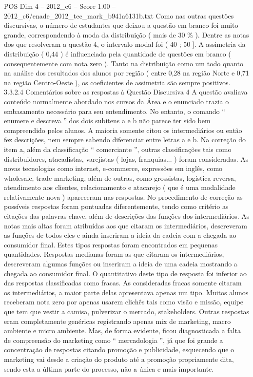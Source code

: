 \begin{textsample}{POS Dim 4 – 2012\_c6 – Score 1.00 – 2012\_c6/enade\_2012\_tec\_mark\_b941a6131b.txt}
Como nas outras questões discursivas, o número de estudantes que deixou a questão em branco foi muito grande, correspondendo à moda da distribuição ( mais de 30 \% ).
Dentre as notas dos que resolveram a questão 4, o intervalo modal foi ( 40 ; 50 ].
A assimetria da distribuição ( 0,44 ) é influenciada pela quantidade de questões em branco ( consequentemente com nota zero ).
Tanto na distribuição como um todo quanto na análise dos resultados dos alunos por região ( entre 0,28 na região Norte e 0,71 na região Centro-Oeste ), os coeficientes de assimetria são sempre positivos. 3.3.2.4 Comentários sobre as respostas à Questão Discursiva 4 A questão avaliava conteúdo normalmente abordado nos cursos da Área e o enunciado trazia o embasamento necessário para seu entendimento.
No entanto, o comando “ enumere e descreva ” dos dois subitens a e b não parece ter sido bem compreendido pelos alunos.
A maioria somente citou os intermediários ou então fez descrições, nem sempre sabendo diferenciar entre letras a e b.
Na correção do item a, além da classificação “ comerciante ”, outras classificações tais como distribuidores, atacadistas, varejistas ( lojas, franquias... ) foram consideradas.
As novas tecnologias como internet, e-commerce, expressões em inglês, como wholesale, trade marketing, além de outras, como grossistas, logística reversa, atendimento aos clientes, relacionamento e atacarejo ( que é uma modalidade relativamente nova ) apareceram nas respostas.
No procedimento de correção as possíveis respostas foram pontuadas diferentemente, tendo como critério as citações das palavras-chave, além de descrições das funções dos intermediários.
As notas mais altas foram atribuídas aos que citaram os intermediários, descreveram as funções de todos eles e ainda inseriram a ideia da cadeia com a chegada ao consumidor final.
Estes tipos respostas foram encontrados em pequenas quantidades.
Respostas medianas foram as que citaram os intermediários, descreveram algumas funções ou inseriram a ideia de uma cadeia mostrando a chegada ao consumidor final.
O quantitativo deste tipo de resposta foi inferior ao das respostas classificadas como fracas.
As consideradas fracas somente citaram os intermediários, a maior parte delas apresentava apenas um tipo.
Muitos alunos receberam nota zero por apenas usarem clichês tais como visão e missão, equipe que tem que vestir a camisa, pulverizar o mercado, stakeholders.
Outras respostas eram completamente genéricas registrando apenas mix de marketing, macro ambiente e micro ambiente.
Mas, de forma evidente, ficou diagnosticada a falta de compreensão do marketing como “ mercadologia ”, já que foi grande a concentração de respostas citando promoção e publicidade, esquecendo que o marketing vai desde a criação do produto até a promoção propriamente dita, sendo esta a última parte do processo, não a única e mais importante.

\end{textsample}
